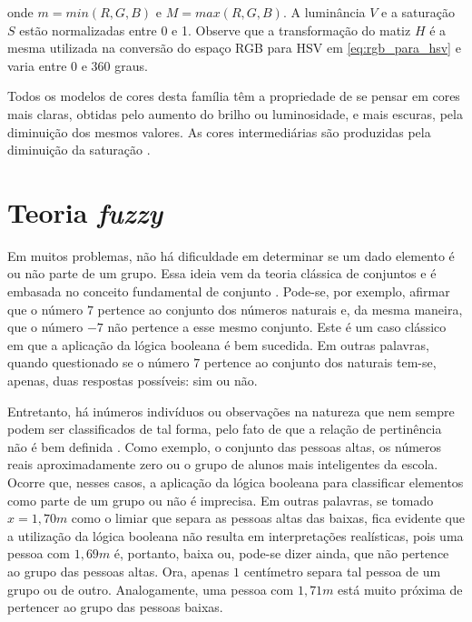 \noindent onde $m = min(R, G ,B)$ e $M = max(R, G ,B)$. A luminância $V$ e a saturação $S$ estão normalizadas entre 0 e 1. Observe que a transformação do matiz $H$ é a mesma utilizada na conversão do espaço RGB para HSV em \ref{eq:rgb_para_hsv} e varia entre 0 e 360 graus.

Todos os modelos de cores desta família têm a propriedade de se pensar em cores mais claras, obtidas pelo aumento do brilho ou luminosidade, e mais escuras, pela diminuição dos mesmos valores. As cores intermediárias são produzidas pela diminuição da saturação \citep{pedrini:08}.

\section{Teoria \emph{fuzzy}}
\label{sec:teoria_fuzzy}

Em muitos problemas, não há dificuldade em determinar se um dado elemento é ou não parte de um grupo. Essa ideia vem da teoria clássica de conjuntos e é embasada no conceito fundamental de conjunto \citep{chen:00}. Pode-se, por exemplo, afirmar que o número $7$ pertence ao conjunto dos números naturais e, da mesma maneira, que o número $-7$ não pertence a esse mesmo conjunto. Este é um caso clássico em que a aplicação da lógica booleana é bem sucedida. Em outras palavras, quando questionado se o número $7$ pertence ao conjunto dos naturais tem-se, apenas, duas respostas possíveis: sim ou não.

Entretanto, há inúmeros indivíduos ou observações na natureza que nem sempre podem ser classificados de tal forma, pelo fato de que a relação de pertinência não é bem definida \citep{pedrycz:98}. Como exemplo, o conjunto das pessoas altas, os números reais aproximadamente zero ou o grupo de alunos mais inteligentes da escola. Ocorre que, nesses casos, a aplicação da lógica booleana para classificar elementos como parte de um grupo ou não é imprecisa. Em outras palavras, se tomado $x = 1,70m$ como o limiar que separa as pessoas altas das baixas, fica evidente que a utilização da lógica booleana não resulta em interpretações realísticas, pois uma pessoa com $1,69m$ é, portanto, baixa ou, pode-se dizer ainda, que não pertence ao grupo das pessoas altas. Ora, apenas $1$ centímetro separa tal pessoa de um grupo ou de outro. Analogamente, uma pessoa com $1,71m$ está muito próxima de pertencer ao grupo das pessoas baixas.

